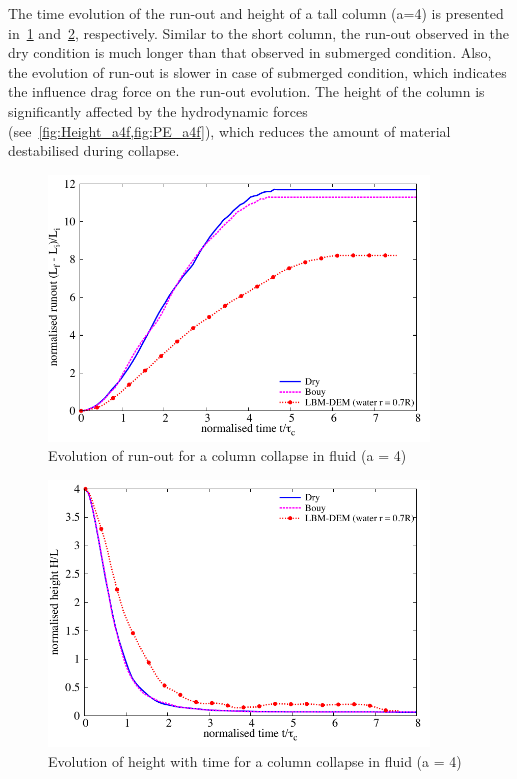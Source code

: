 The time evolution of the run-out and height of a tall column (a=4) is 
presented in~\cref{fig:Runout_a4f} and~\cref{fig:Height_a4f}, respectively. 
Similar to the short column, the run-out observed in the dry condition is much 
longer than that observed in submerged condition. Also, the evolution of 
run-out is slower in case of submerged condition, which indicates the influence 
drag force on the run-out evolution. The height of the column is significantly 
affected by the hydrodynamic forces (see~\cref{fig:Height_a4f,fig:PE_a4f}), 
which reduces the amount of material destabilised 
during collapse.  
\begin{figure}[htpb]
\centering
\includegraphics[width=0.9\textwidth]{Runout_a4f}
\caption{Evolution of run-out for a column collapse in fluid (a = 4)}
\label{fig:Runout_a4f}
\end{figure}

\begin{figure}[htpb]
\centering
\includegraphics[width=0.9\textwidth]{Height_a4f}
\caption{Evolution of height with time for a column collapse in fluid 
(a = 4)}
\label{fig:Height_a4f}
\end{figure}

